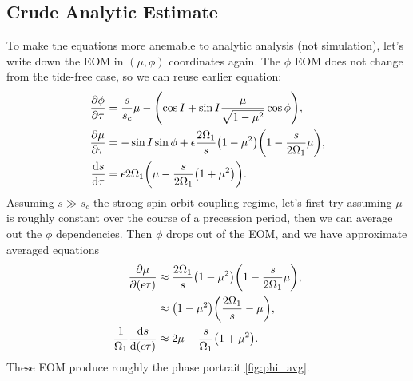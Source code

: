 \documentclass[11pt,
        usenames, %
        dvipsnames %
    ]{article}
\newcommand*{\rd}[2]{\frac{\mathrm{d}#1}{\mathrm{d}#2}}
\newcommand*{\pd}[2]{\frac{\partial#1}{\partial#2}}
\DeclarePairedDelimiter\p{\lparen}{\rparen}
\begin{document}
\subsection{Crude Analytic Estimate}

To make the equations more anemable to analytic analysis (not simulation), let's
write down the EOM in $(\mu, \phi)$ coordinates again. The $\phi$ EOM does not
change from the tide-free case, so we can reuse earlier equation:
\begin{align}
    \pd{\phi}{\tau} &= \frac{s}{s_c}\mu
        - \p*{\cos I + \sin I \frac{\mu}{\sqrt{1 - \mu^2}} \cos \phi} ,\\
    \pd{\mu}{\tau} &= -\sin I \sin \phi +
        \epsilon \frac{2\Omega_1}{s}\p*{1 - \mu^2}
            \p*{1 - \frac{s}{2\Omega_1}\mu},\\
    \rd{s}{\tau}
        &= \epsilon 2\Omega_1 \p*{\mu - \frac{s}{2\Omega_1}\p*{1 + \mu^2}}.
\end{align}
Assuming $s \gg s_c$ the strong spin-orbit coupling regime, let's first try
assuming $\mu$ is roughly constant over the course of a precession period, then
we can average out the $\phi$ dependencies. Then $\phi$ drops out of the EOM,
and we have approximate averaged equations
\begin{subequations}\label{se:prec_avg}
    \begin{align}
        \pd{\mu}{(\epsilon\tau)} &\approx \frac{2\Omega_1}{s}\p*{1 - \mu^2}
                \p*{1 - \frac{s}{2\Omega_1}\mu},\nonumber\\
            &\approx \p*{1 - \mu^2}
                \p*{\frac{2\Omega_1}{s} - \mu},\\
        \frac{1}{\Omega_1}\rd{s}{(\epsilon\tau)}
            &\approx 2\mu - \frac{s}{\Omega_1}\p*{1 + \mu^2}.
    \end{align}
\end{subequations}
These EOM produce roughly the phase portrait \autoref{fig:phi_avg}.
\end{document}
